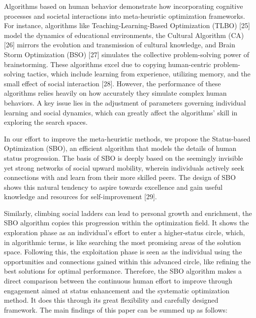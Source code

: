 \documentclass{article} %
\begin{document}
Algorithms based on human behavior demonstrate how incorporating cognitive processes and societal interactions into meta-heuristic optimization frameworks. For instance, algorithms like Teaching-Learning-Based Optimization (TLBO) [25] model the dynamics of educational environments, the Cultural Algorithm (CA) [26] mirrors the evolution and transmission of cultural knowledge, and Brain Storm Optimization (BSO) [27] simulates the collective problem-solving power of brainstorming. These algorithms excel due to copying human-centric problem-solving tactics, which include learning from experience, utilizing memory, and the small effect of social interaction [28]. However, the performance of these algorithms relies heavily on how accurately they simulate complex human behaviors. A key issue lies in the adjustment of parameters governing individual learning and social dynamics, which can greatly affect the algorithms' skill in exploring the search spaces.

In our effort to improve the meta-heuristic methods, we propose the Status-based Optimization (SBO), an efficient algorithm that models the details of human status progression. The basis of SBO is deeply based on the seemingly invisible yet strong networks of social upward mobility, wherein individuals actively seek connections with and learn from their more skilled peers. The design of SBO shows this natural tendency to aspire towards excellence and gain useful knowledge and resources for self-improvement [29].

Similarly, climbing social ladders can lead to personal growth and enrichment, the SBO algorithm copies this progression within the optimization field. It shows the exploration phase as an individual's effort to enter a higher-status circle, which, in algorithmic terms, is like searching the most promising areas of the solution space. Following this, the exploitation phase is seen as the individual using the opportunities and connections gained within this advanced circle, like refining the best solutions for optimal performance. Therefore, the SBO algorithm makes a direct comparison between the continuous human effort to improve through engagement aimed at status enhancement and the systematic optimization method. It does this through its great flexibility and carefully designed framework. The main findings of this paper can be summed up as follows:
\end{document}

